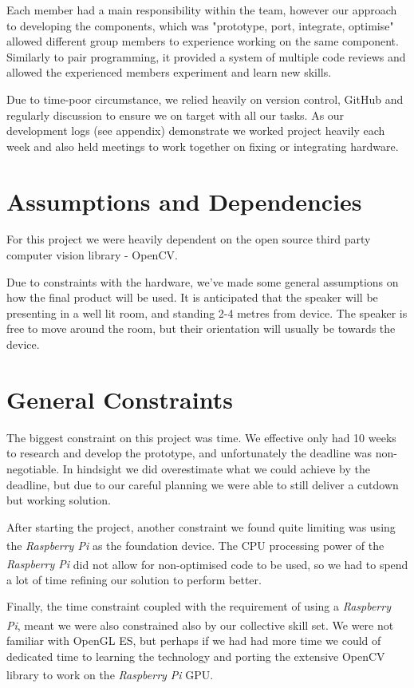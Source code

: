 \documentclass[11pt,a4paper,titlepage]{report}
\newcommand{\rpi}{\textit{Raspberry Pi\textsuperscript{\textregistered}}}
\begin{document}
Each member had a main responsibility within the team, however our approach to developing the components, which was "prototype, port, integrate, optimise" allowed different group members to experience working on the same component. Similarly to pair programming, it provided a system of multiple code reviews and allowed the experienced members experiment and learn new skills.

Due to time-poor circumstance, we relied heavily on version control, GitHub and regularly discussion to ensure we on target with all our tasks. As our development logs (see appendix) demonstrate we worked project heavily each week and also held meetings to work together on fixing or integrating hardware.




\section{Assumptions and Dependencies}

For this project we were heavily dependent on the open source third party computer vision library - OpenCV.

Due to constraints with the hardware, we've made some general assumptions on how the final product will be used. It is anticipated that the speaker will be presenting in a well lit room, and standing 2-4 metres from device. The speaker is free to move around the room, but their orientation will usually be towards the device.

\section{General Constraints}

The biggest constraint on this project was time. We effective only had 10 weeks to research and develop the prototype, and unfortunately the deadline was non-negotiable. In hindsight we did overestimate what we could achieve by the deadline, but due to our careful planning we were able to still deliver a cutdown but working solution.

After starting the project, another constraint we found quite limiting was using the \rpi\xspace as the foundation device. The CPU processing power of the \rpi\xspace did not allow for non-optimised code to be used, so we had to spend a lot of time refining our solution to perform better. 

Finally, the time constraint coupled with the requirement of using a \rpi, meant we were also constrained also by our collective skill set. We were not familiar with OpenGL ES, but perhaps if we had had more time we could of dedicated time to learning the technology and porting the extensive OpenCV library to work on the \rpi\xspace GPU. 
\end{document}
